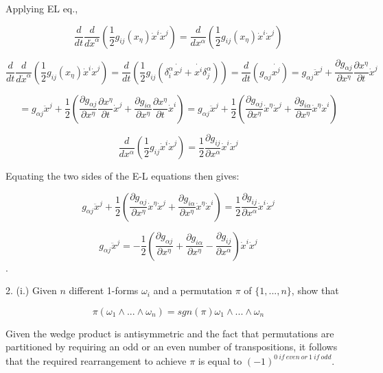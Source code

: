 \documentclass{article}
\begin{document}
Applying EL eq.,

$$
\frac{d}{dt}\frac{d}{d\dot{x}^{\alpha}}\left(
\frac{1}{2}g_{ij}(x_{\eta})\dot{x}^i\dot{x}^j
\right)=\frac{d}{dx^{\alpha}}\left(
\frac{1}{2}g_{ij}(x_{\eta})\dot{x}^i\dot{x}^j
\right)
$$


$$
\frac{d}{dt}\frac{d}{d\dot{x}^{\alpha}}\left(
\frac{1}{2}g_{ij}(x_{\eta})\dot{x}^i\dot{x}^j
\right)= \frac{d}{dt}\left( \frac{1}{2}g_{ij}(\delta^{\alpha}_{i}\dot{x^j}+\dot{x^i}\delta^{\alpha}_{j})\right)
=\frac{d}{dt}\left( g_{\alpha j}\dot{x^j}\right)
=g_{\alpha j}\ddot{x}^j+\frac{\partial g_{\alpha j}}{\partial x^{\eta} }\frac{\partial x^{\eta}}{\partial t}\dot{x}^{j} 
$$


\[
    =g_{\alpha j}\ddot{x}^{j}+\frac{1}{2}
\left( \frac{\partial g_{\alpha j}}{\partial x^{\eta} }\frac{\partial x^{\eta}}{\partial t}\dot{x}^{j}+
\frac{\partial g_{i \alpha }}{\partial x^{\eta} }\frac{\partial x^{\eta}}{\partial t}\dot{x}^{i}\right) 
= g_{\alpha j}\ddot{x}^{j}+\frac{1}{2}
\left( \frac{\partial g_{\alpha j}}{\partial x^{\eta} }\dot{x}^{\eta}\dot{x}^{j}+
\frac{\partial g_{i \alpha }}{\partial x^{\eta} }\dot{x}^{\eta} \dot{x}^{i}\right) 
\] 



$$
\frac{d}{dx^{\alpha}}\left(
\frac{1}{2}g_{ij}\dot{x}^i\dot{x}^j
\right)= \frac{1}{2} \frac{\partial g_{i j}}{\partial x^{\alpha } }\dot{x}^{i} \dot{x}^{j}
$$

Equating the two sides of the E-L equations then gives:

\[ 
 g_{\alpha j}\ddot{x}^{j}+\frac{1}{2}
\left( \frac{\partial g_{\alpha j}}{\partial x^{\eta} }\dot{x}^{\eta}\dot{x}^{j}+
\frac{\partial g_{i \alpha }}{\partial x^{\eta} }\dot{x}^{\eta} \dot{x}^{i}\right) 
  =  \frac{1}{2} \frac{\partial g_{i j}}{\partial x^{\alpha } }\dot{x}^{i} \dot{x}^{j}
\]


\[
    g_{\alpha j} \ddot{x}^{j} = - \frac{1}{2} \left( \frac{\partial g_{\alpha  j}}{\partial x^{\eta} }
    + \frac{\partial g_{i \alpha }}{\partial x^{\eta} } -\frac{\partial g_{ij}}{\partial x^{\alpha} } \right)
    \dot{x}^{i}\dot{x}^{j}  
\]. 




2. (i.) Given $n$ different 1-forms $\omega_i$ and a permutation $\pi$ of $\lbrace 1,...,n\rbrace$, show that 

$$
\pi(\omega_1\wedge ... \wedge \omega_n)= sgn(\pi)\omega_1\wedge...\wedge\omega_n
$$

Given the wedge product is antisymmetric and the fact that permutations are partitioned by requiring an odd or an even number of transpositions, it follows that the required rearrangement to achieve $\pi$ is equal to $(-1)^{0\ if\ even \ or\ 1\ if \ odd}$.
\end{document}
